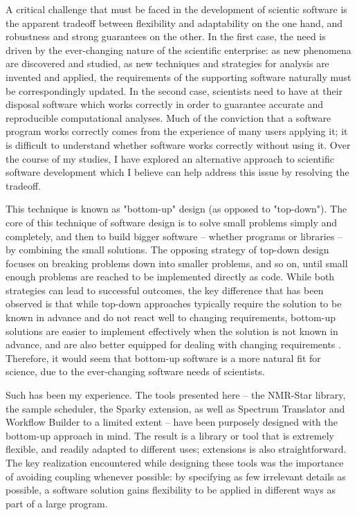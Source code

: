 A critical challenge that must be faced in the development of scientic software
is the apparent tradeoff between flexibility and adaptability on the one hand,
and robustness and strong guarantees on the other.  In the first case, the 
need is driven by the ever-changing nature of the scientific enterprise: as
new phenomena are discovered and studied, as new techniques and strategies for
analysis are invented and applied, the requirements of the supporting software
naturally must be correspondingly updated.  In the second case, scientists 
need to have at their disposal software which works correctly in order to 
guarantee accurate and reproducible computational analyses.  Much of the 
conviction that a software program works correctly comes from the experience 
of many users applying it; it is difficult to understand whether software 
works correctly without using it.  Over the course of my studies, I have 
explored an alternative approach to scientific software development which I 
believe can help address this issue by resolving the tradeoff.

This technique is known as "bottom-up" \cite{bottomup1994, bottomup2004} design
(as opposed to "top-down").  The core of this technique of software design is
to solve small problems simply and completely, and then to build bigger software
 -- whether programs or libraries -- by combining the small solutions.  The
opposing strategy of top-down design focuses on breaking problems down into 
smaller problems, and so on, until small enough problems are reached to be 
implemented directly as code.  While both strategies can lead to successful
outcomes, the key difference that has been observed is that while top-down
approaches typically require the solution to be known in advance and do not
react well to changing requirements, bottom-up solutions are easier to implement
effectively when the solution is not known in advance, and are also better
equipped for dealing with changing requirements 
\cite{topdown_bottomup, bottomup1994, bottomup2004}.  Therefore, it would seem
that bottom-up software is a more natural fit for science, due to the ever-changing
software needs of scientists.

Such has been my experience.  The tools presented here -- the NMR-Star library,
the sample scheduler, the Sparky extension, as well as Spectrum Translator and
Workflow Builder to a limited extent -- have been purposely designed with 
the bottom-up approach in mind.  The result is a library or tool that is 
extremely flexible, and readily adapted to different uses; extensions is also
straightforward.  The key realization encountered while designing these tools
was the importance of avoiding coupling \cite{coupling1992} whenever possible:
by specifying as few irrelevant details as possible, a software solution gains
flexibility to be applied in different ways as part of a large program.
 

